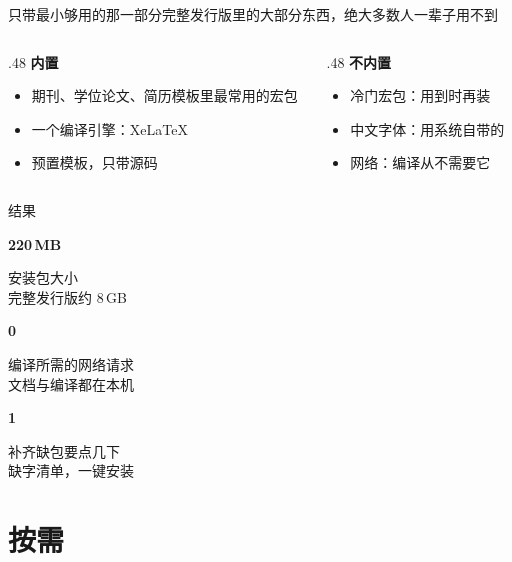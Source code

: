\documentclass[aspectratio=169,12pt]{ctexbeamer}
\newcommand{\bignum}[2]{%
  \begin{minipage}[t]{.31\linewidth}
    {\fontsize{32}{38}\selectfont\bfseries\color{accent}#1}\par\vspace{4pt}
    {\small\color{mist}#2}
  \end{minipage}}
\begin{document}
\begin{frame}{只带最小够用的那一部分}{完整发行版里的大部分东西，绝大多数人一辈子用不到}
  \begin{columns}[T]
    \begin{column}{.48\textwidth}
      \textbf{内置}
      \begin{itemize}
        \item 期刊、学位论文、简历模板里最常用的宏包
        \item 一个编译引擎：Xe\LaTeX{}
        \item 预置模板，只带源码
      \end{itemize}
    \end{column}
    \begin{column}{.48\textwidth}
      {\color{mist}\textbf{不内置}}
      \begin{itemize}
        \item[{\color{mist}\rule[.3ex]{4pt}{4pt}}] {\color{mist}冷门宏包：用到时再装}
        \item[{\color{mist}\rule[.3ex]{4pt}{4pt}}] {\color{mist}中文字体：用系统自带的}
        \item[{\color{mist}\rule[.3ex]{4pt}{4pt}}] {\color{mist}网络：编译从不需要它}
      \end{itemize}
    \end{column}
  \end{columns}
\end{frame}

\begin{frame}{结果}
  \vspace{.4cm}
  \bignum{220\,MB}{安装包大小\\完整发行版约 8\,GB}\hfill
  \bignum{0}{编译所需的网络请求\\文档与编译都在本机}\hfill
  \bignum{1}{补齐缺包要点几下\\缺字清单，一键安装}
\end{frame}

\section{按需}
\end{document}
